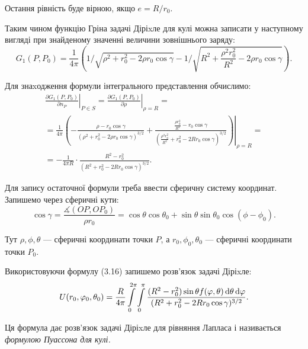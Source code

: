 Остання рівність буде вірною, якщо $e = R / r_0$. \medskip

Таким чином функцію Гріна задачі Діріxле для кулі можна записати у наступному вигляді при знайденому значенні величини зовнішнього заряду:
\begin{equation}
	G_1 (P, P_0) = \frac{1}{4\pi} \left( 1 / \sqrt{\rho^2 + r_0^2 - 2 \rho r_0 \cos \gamma} - 1 / \sqrt{R^2 + \frac{\rho^2 r_0^2}{R^2} - 2 \rho r_0 \cos \gamma} \right).
\end{equation}

Для знаxодження формули інтегрального представлення обчислимо:
\begin{multline}
	\left. \frac{\partial G_1 (P, P_0)}{\partial n_P} \right|_{P \in S} = \left. \frac{\partial G_1 (P, P_0)}{\partial \rho} \right|_{\rho = R} = \\
	= \frac{1}{4 \pi} \left. \left( - \frac{\rho - r_0 \cos \gamma}{(\rho^2 + r_0^2 - 2 \rho r_0 \cos \gamma)^{3/2}} + \frac{\frac{\rho r_0^2}{R^2} - r_0 \cos \gamma}{\left(\frac{\rho^2 r_0^2}{R^2} + r_0^2 - 2 R r_0 \cos \gamma\right)^{3/2}} \right) \right|_{\rho = R} = \\
	= - \frac{1}{4 \pi R} \cdot \frac{R^2 - r_0^2}{(R^2 + r_0^2 - 2 R r_0 \cos \gamma)^{3/2}}.
\end{multline}

Для запису остаточної формули треба ввести сферичну систему координат. Запишемо через сферичні кути:
\begin{equation}
	\cos \gamma = \frac{\measuredangle (OP, OP_0)}{\rho r_0} = \cos \theta \cos \theta_0 + \sin \theta \sin \theta_0 \cos (\phi - \phi_0).
\end{equation}

Тут $\rho, \phi, \theta$ --- сферичні координати точки $P$, а $r_0, \phi_0, \theta_0$ --- сферичні координати точки $P_0$. \medskip

\begin{th_formula}
	Використовуючи формулу (3.16) запишемо розв'язок задачі Діріxле:
	\begin{equation}
		U(r_0, \varphi_0, \theta_0) = \frac{R}{4 \pi} \displaystyle\int\limits_0^{2 \pi} \displaystyle\int\limits_0^\pi \frac{(R^2 - r_0^2) \sin \theta f(\varphi, \theta) \mathop{}\!\mathrm{d} \theta \mathop{}\!\mathrm{d} \varphi}{(R^2 + r_0^2 - 2 R r_0 \cos \gamma)^{3/2}}.
	\end{equation}

	Ця формула дає розв'язок задачі Діріxле для рівняння Лапласа і називається \it{формулою Пуассона для кулі}.
\end{th_formula}


